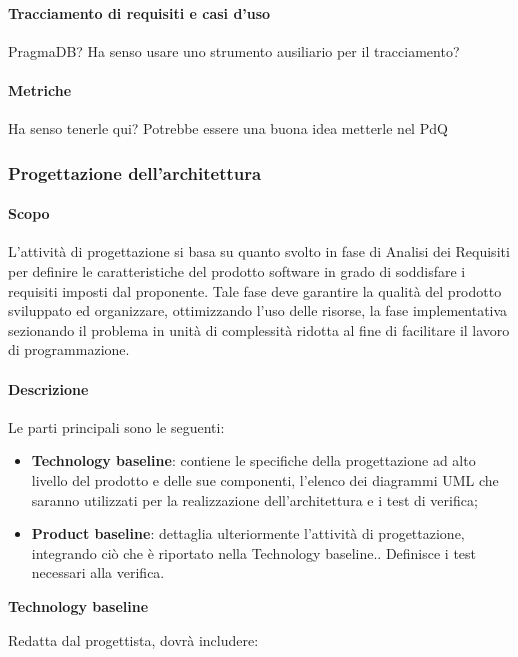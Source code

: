 \paragraph{Tracciamento di requisiti e casi d'uso}
PragmaDB? Ha senso usare uno strumento ausiliario per il tracciamento? 
\paragraph{Metriche}
Ha senso tenerle qui? Potrebbe essere una buona idea metterle nel PdQ

\subsubsection{Progettazione dell'architettura}
\paragraph{Scopo}
L'attività di progettazione si basa su quanto svolto in fase di Analisi dei Requisiti per definire le caratteristiche del prodotto software in grado di soddisfare i requisiti imposti dal proponente.  Tale fase deve garantire la qualità del prodotto sviluppato ed organizzare, ottimizzando l'uso delle risorse, la fase implementativa sezionando il problema in unità di complessità ridotta al fine di facilitare il lavoro di programmazione.

\paragraph{Descrizione}
Le parti principali sono le seguenti:
\begin{itemize}
\item \textbf{Technology baseline}: contiene le specifiche della progettazione ad alto livello del prodotto e delle sue componenti, l'elenco dei diagrammi UML che saranno utilizzati per la realizzazione dell'architettura e i test di verifica;

\item \textbf{Product baseline}: dettaglia ulteriormente l'attività di progettazione,  integrando ciò che è riportato nella Technology baseline..  Definisce i test necessari alla verifica. 
\end{itemize}

\textbf{Technology baseline}

Redatta dal progettista, dovrà includere:

